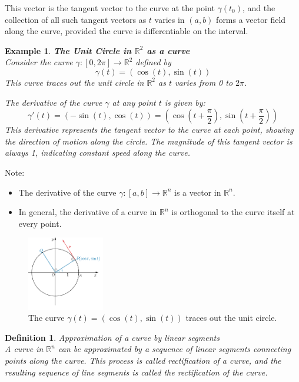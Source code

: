 \documentclass[11pt]{book} %
\newtheorem{definition}{Definition}[section]
\newtheorem{example}{Example}[section]
\begin{document}
This vector is the tangent vector to the curve at the point \( \gamma(t_0) \), and the collection of all such tangent vectors as
\( t \) varies in \( (a, b) \) forms a vector field along the curve, provided the curve is differentiable on the interval.


\begin{example}{\textbf{The Unit Circle in \( \mathbb{R}^2 \) as a curve}} \\
    Consider the curve \( \gamma: [0, 2\pi] \to \mathbb{R}^2 \) defined by
    \[
    \gamma(t) = (\cos(t), \sin(t)) 
    \]
    This curve traces out the unit circle in \( \mathbb{R}^2 \) as \( t \) varies from 0 to \( 2\pi \).

    The derivative of the curve \( \gamma \) at any point \( t \) is given by:
    \[
    \gamma'(t) = \left( -\sin(t), \cos(t) \right) = \left( \cos\left(t + \frac{\pi}{2}\right), \sin\left(t + \frac{\pi}{2}\right) \right)
    \]
    This derivative represents the tangent vector to the curve at each point, 
    showing the direction of motion along the circle. The magnitude of this tangent vector is always 1, indicating constant speed along the curve.
\end{example}

Note:  
\begin{itemize}
    \item The derivative of the curve \( \gamma : [a,b] \to \mathbb{R}^n \) is a vector in \( \mathbb{R}^n \). 
    \item In general, the derivative of a curve in \( \mathbb{R}^n \) is orthogonal to the curve itself at every point.
\end{itemize}


\begin{figure}[H]
    \centering
    \includegraphics[width=0.3\textwidth]{./figs/unit_circle_curve_R2.png}
    \caption{The curve \( \gamma(t) = (\cos(t), \sin(t)) \) traces out the unit circle.}
\end{figure}

\begin{definition}{Approximation of a curve by linear segments} \\
    A curve in \( \mathbb{R}^n \) can be approximated by a sequence of linear segments connecting points along the curve.
    This process is called rectification of a curve, and the resulting sequence of line segments is called the rectification of the curve.
\end{definition}
\end{document}
